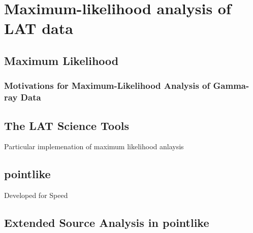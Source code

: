 \chapter{Maximum-likelihood analysis of LAT data}

\section{Maximum Likelihood}

\subsection{Motivations for Maximum-Likelihood Analysis of Gamma-ray Data}

\section{The LAT Science Tools}

\begin{enuemrate}
\item Particular implemenation of maximum likelihood anlaysis
\end{enuemrate}


\section{pointlike}

\begin{enuemrate}
\item Developed for Speed
\end{enuemrate}

\section{Extended Source Analysis in pointlike}
